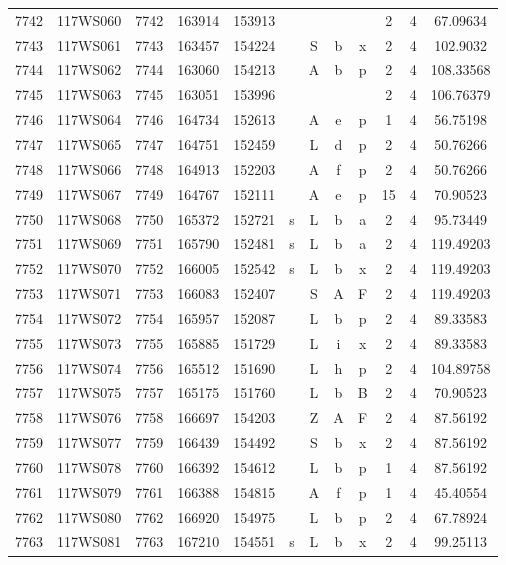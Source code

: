 \begin{tabular}{|*{12}{c|}}
7742 & 117WS060 & 7742 & 163914 & 153913 &  &  &  &  & 2 & 4 & 67.09634 \\ 
7743 & 117WS061 & 7743 & 163457 & 154224 &  & S & b & x & 2 & 4 & 102.9032 \\ 
7744 & 117WS062 & 7744 & 163060 & 154213 &  & A & b & p & 2 & 4 & 108.33568 \\ 
7745 & 117WS063 & 7745 & 163051 & 153996 &  &  &  &  & 2 & 4 & 106.76379 \\ 
7746 & 117WS064 & 7746 & 164734 & 152613 &  & A & e & p & 1 & 4 & 56.75198 \\ 
7747 & 117WS065 & 7747 & 164751 & 152459 &  & L & d & p & 2 & 4 & 50.76266 \\ 
7748 & 117WS066 & 7748 & 164913 & 152203 &  & A & f & p & 2 & 4 & 50.76266 \\ 
7749 & 117WS067 & 7749 & 164767 & 152111 &  & A & e & p & 15 & 4 & 70.90523 \\ 
7750 & 117WS068 & 7750 & 165372 & 152721 & s & L & b & a & 2 & 4 & 95.73449 \\ 
7751 & 117WS069 & 7751 & 165790 & 152481 & s & L & b & a & 2 & 4 & 119.49203 \\ 
7752 & 117WS070 & 7752 & 166005 & 152542 & s & L & b & x & 2 & 4 & 119.49203 \\ 
7753 & 117WS071 & 7753 & 166083 & 152407 &  & S & A & F & 2 & 4 & 119.49203 \\ 
7754 & 117WS072 & 7754 & 165957 & 152087 &  & L & b & p & 2 & 4 & 89.33583 \\ 
7755 & 117WS073 & 7755 & 165885 & 151729 &  & L & i & x & 2 & 4 & 89.33583 \\ 
7756 & 117WS074 & 7756 & 165512 & 151690 &  & L & h & p & 2 & 4 & 104.89758 \\ 
7757 & 117WS075 & 7757 & 165175 & 151760 &  & L & b & B & 2 & 4 & 70.90523 \\ 
7758 & 117WS076 & 7758 & 166697 & 154203 &  & Z & A & F & 2 & 4 & 87.56192 \\ 
7759 & 117WS077 & 7759 & 166439 & 154492 &  & S & b & x & 2 & 4 & 87.56192 \\ 
7760 & 117WS078 & 7760 & 166392 & 154612 &  & L & b & p & 1 & 4 & 87.56192 \\ 
7761 & 117WS079 & 7761 & 166388 & 154815 &  & A & f & p & 1 & 4 & 45.40554 \\ 
7762 & 117WS080 & 7762 & 166920 & 154975 &  & L & b & p & 2 & 4 & 67.78924 \\ 
7763 & 117WS081 & 7763 & 167210 & 154551 & s & L & b & x & 2 & 4 & 99.25113 \\ 

\end{tabular}
